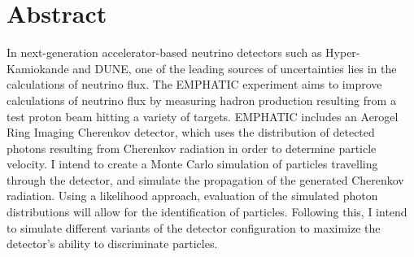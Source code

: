 
\chapter{Abstract}

In next-generation accelerator-based neutrino detectors such as Hyper-Kamiokande and DUNE, one of the leading sources of uncertainties lies in the calculations of neutrino flux. The EMPHATIC experiment aims to improve calculations of neutrino flux by measuring hadron production resulting from a test proton beam hitting a variety of targets. EMPHATIC includes an Aerogel Ring Imaging Cherenkov detector, which uses the distribution of detected photons resulting from Cherenkov radiation in order to determine particle velocity. I intend to create a Monte Carlo simulation of particles travelling through the detector, and simulate the propagation of the generated Cherenkov radiation. Using a likelihood approach, evaluation of the simulated photon distributions will allow for the identification of particles. Following this, I intend to simulate different variants of the detector configuration to maximize the detector's ability to discriminate particles.

\vfill
\begin{center}
\begin{sf}
\end{sf}
\end{center}
